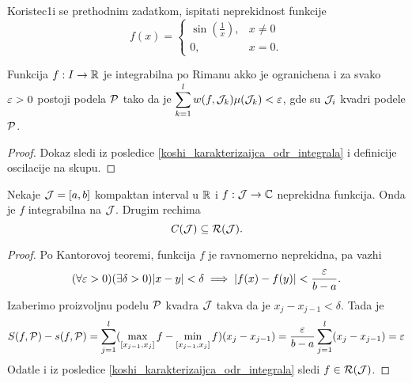 \documentclass[../main.tex]{subfiles}
\begin{document}
	\begin{za}
		Koristec1i se prethodnim zadatkom, ispitati neprekidnost funkcije
		\[f(x)=
		\begin{cases}
			\sin(\frac{1}{x}), & x \neq 0\\
			0, & x = 0.
		\end{cases}
		\]
	\end{za}

	\begin{posl}
		Funkcija $f: I \to \mathbb{R}$ je integrabilna po Rimanu akko je ogranichena i za svako $\varepsilon > 0$ postoji podela $\mathcal P$ 
		tako da je $\displaystyle{\sum_{k=1}^{l} w(f,\mathcal J _k)\mu(\mathcal J _k) < \varepsilon}$, gde su $\mathcal J _i$ kvadri podele $\mathcal P$.
	\end{posl}

	\begin{proof}
		Dokaz sledi iz posledice \ref{koshi_karakterizaijca_odr_integrala} i definicije oscilacije na skupu.
	\end{proof}

	\begin{pr}
		Nekaje $\mathcal J = [a, b]$ kompaktan interval u $\mathbb{R}$ i $f: \mathcal J \to \mathbb{C}$ neprekidna funkcija. Onda je $f$ integrabilna na $\mathcal J$. Drugim rechima
		\[\mathit{C} (\mathcal J)\subseteq \mathcal R (\mathcal J).\]
	\end{pr}

	\begin{proof}
		Po Kantorovoj teoremi, funkcija $f$ je ravnomerno neprekidna, pa vazhi
		\[(\forall \varepsilon > 0) (\exists \delta > 0) |x - y| < \delta \implies |f(x) - f(y)| < \frac{\varepsilon}{b - a}.\]
		Izaberimo proizvoljnu podelu $\mathcal P$ kvadra $\mathcal J$ takva da je $x_j - x_{j-1} < \delta$. Tada je 
		\[
			S(f,\mathcal{P}) - s(f,\mathcal{P}) = \displaystyle{\sum_{j=1}^{l}(\max_{[x_{j-1},x_j]}f - \min_{[x_{j-1}, x_j]}f) (x_j - x_{j-1})
								= \frac{\varepsilon}{b-a}\sum_{j=1}^{l}(x_j - x_{j-1}) = \varepsilon} 
		\]
		Odatle i iz posledice \ref{koshi_karakterizaijca_odr_integrala} sledi $f \in \mathcal R(\mathcal J)$.
	\end{proof}


	
\end{document}
